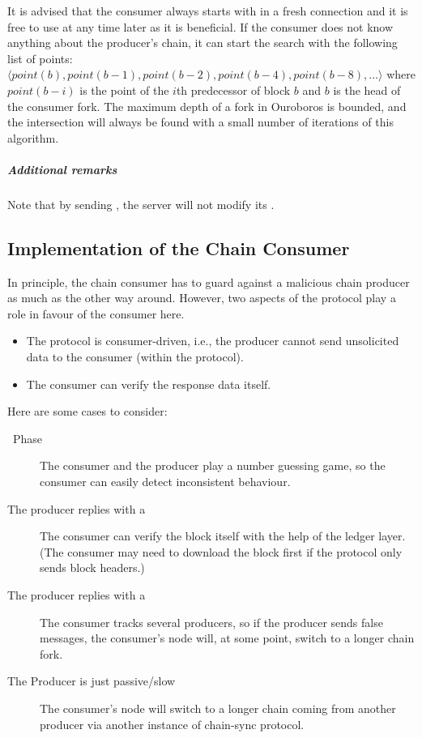 It is advised that the consumer always starts with \MsgFindIntersect{} in a fresh connection
and it is free to use \MsgFindIntersect{} at any time later as it is beneficial.
If the consumer does not know anything about the producer's chain,
it can start the search with the following list of points:
$\langle point(b), point(b-1), point(b-2), point(b-4), point (b-8),\ldots \rangle$
where $point(b-i)$ is the point of the $i$th predecessor of block $b$ and
$b$ is the head of the consumer fork.
The maximum depth of a fork in Ouroboros is bounded, and the intersection will always be found with a small number of
iterations of this algorithm.

\subparagraph{Additional remarks}
Note that by sending \MsgFindIntersect{}, the server will not modify its
\readpointer{}.

\subsection{Implementation of the Chain Consumer}
In principle, the chain consumer has to guard against a malicious chain producer
as much as the other way around.
However, two aspects of the protocol play a role in favour of the consumer here.
\begin{itemize}
  \item The protocol is consumer-driven, i.e., the producer cannot send unsolicited
data to the consumer (within the protocol).
  \item The consumer can verify the response data itself.
\end{itemize}
Here are some cases to consider:
\begin{description}
\item[\MsgFindIntersect~Phase]
  The consumer and the producer play a number guessing game, so the consumer can easily detect
  inconsistent behaviour.
\item[The producer replies with a \MsgRollForward] The consumer can verify the block itself
  with the help of the ledger layer.
  (The consumer may need to download the block first if the protocol only sends block headers.)
\item[The producer replies with a \MsgRollBackward] The consumer tracks several producers, so
  if the producer sends false \MsgRollBackward{} messages, the consumer's node
  will, at some point, switch to a longer chain fork.
\item[The Producer is just passive/slow] The consumer's node will switch to
  a longer chain coming from another producer via another instance of
    chain-sync protocol.
\end{description}

